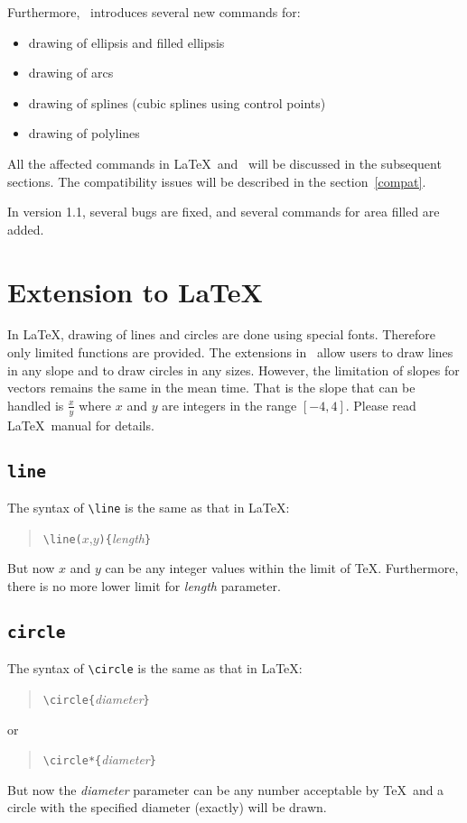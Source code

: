 Furthermore, \eepic\ introduces several new commands for:
\begin{itemize}\parskip=0pt
\item drawing of ellipsis and filled ellipsis
\item drawing of arcs
\item drawing of splines (cubic splines using control points)
\item drawing of polylines
\end{itemize}

All the affected commands in \LaTeX\ and \epic\ will be discussed
in the subsequent sections. The compatibility issues will be
described in the section~\ref{compat}.

In version 1.1, several bugs are fixed, and several commands for
area filled are added.
\clearpage


\section{Extension to \LaTeX}

In \LaTeX, drawing of lines and circles are done using special
fonts. Therefore only limited functions are provided. The
extensions in \eepic\ allow users to draw lines in any slope and
to draw circles in any sizes. However, the limitation of slopes
for vectors remains the same in the mean time. That is the slope
that can be handled is $\frac{x}{y}$ where $x$ and $y$ are
integers in the range $[-4,4]$. Please read \LaTeX\ manual for
details.


\subsection{\tt \BS line}
The syntax of \verb|\line| is the same as that in \LaTeX:
\begin{quote}
\verb|\line(|$x$,$y$\verb|){|{\em length}\verb|}|
\end{quote}
But now $x$ and $y$ can be any integer values within the limit of
\TeX. Furthermore, there is no more lower limit for {\em length}
parameter.


\subsection{\tt \BS circle}
The syntax of \verb|\circle| is the same as that in \LaTeX:
\begin{quote}
\verb|\circle{|{\em diameter}\verb|}|
\end{quote}
or
\begin{quote}
\verb|\circle*{|{\em diameter}\verb|}|
\end{quote}
But now the {\em diameter} parameter can be any number acceptable
by \TeX\ and a circle with the specified diameter (exactly) will
be drawn.


